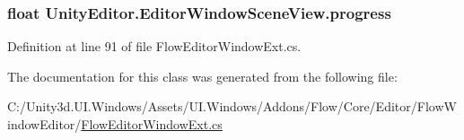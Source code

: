 \subsubsection[{progress}]{\setlength{\rightskip}{0pt plus 5cm}float Unity\+Editor.\+Editor\+Window\+Scene\+View.\+progress\hspace{0.3cm}{\ttfamily [protected]}}\label{class_unity_editor_1_1_editor_window_scene_view_ac23a4737866653a41e680de245a58eff}


Definition at line 91 of file Flow\+Editor\+Window\+Ext.\+cs.



The documentation for this class was generated from the following file\+:\begin{DoxyCompactItemize}
\item 
C\+:/\+Unity3d.\+U\+I.\+Windows/\+Assets/\+U\+I.\+Windows/\+Addons/\+Flow/\+Core/\+Editor/\+Flow\+Window\+Editor/\hyperlink{_flow_editor_window_ext_8cs}{Flow\+Editor\+Window\+Ext.\+cs}\end{DoxyCompactItemize}
